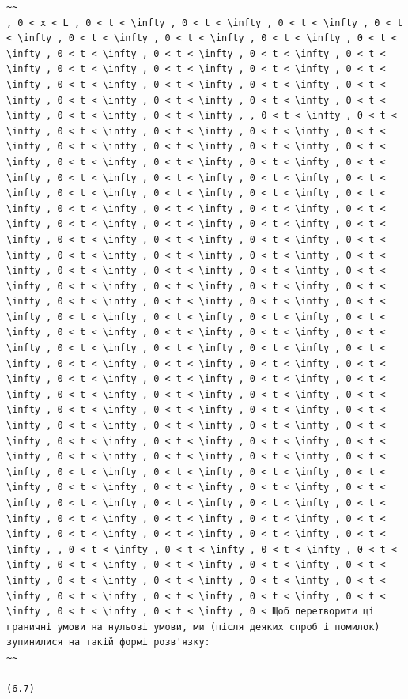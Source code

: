 \documentclass[
  ukrainian,
]{article}
\begin{document}
\begin{verbatim}
~~
, 0 < x < L , 0 < t < \infty , 0 < t < \infty , 0 < t < \infty , 0 < t < \infty , 0 < t < \infty , 0 < t < \infty , 0 < t < \infty , 0 < t < \infty , 0 < t < \infty , 0 < t < \infty , 0 < t < \infty , 0 < t < \infty , 0 < t < \infty , 0 < t < \infty , 0 < t < \infty , 0 < t < \infty , 0 < t < \infty , 0 < t < \infty , 0 < t < \infty , 0 < t < \infty , 0 < t < \infty , 0 < t < \infty , 0 < t < \infty , 0 < t < \infty , 0 < t < \infty , 0 < t < \infty , , 0 < t < \infty , 0 < t < \infty , 0 < t < \infty , 0 < t < \infty , 0 < t < \infty , 0 < t < \infty , 0 < t < \infty , 0 < t < \infty , 0 < t < \infty , 0 < t < \infty , 0 < t < \infty , 0 < t < \infty , 0 < t < \infty , 0 < t < \infty , 0 < t < \infty , 0 < t < \infty , 0 < t < \infty , 0 < t < \infty , 0 < t < \infty , 0 < t < \infty , 0 < t < \infty , 0 < t < \infty , 0 < t < \infty , 0 < t < \infty , 0 < t < \infty , 0 < t < \infty , 0 < t < \infty , 0 < t < \infty , 0 < t < \infty , 0 < t < \infty , 0 < t < \infty , 0 < t < \infty , 0 < t < \infty , 0 < t < \infty , 0 < t < \infty , 0 < t < \infty , 0 < t < \infty , 0 < t < \infty , 0 < t < \infty , 0 < t < \infty , 0 < t < \infty , 0 < t < \infty , 0 < t < \infty , 0 < t < \infty , 0 < t < \infty , 0 < t < \infty , 0 < t < \infty , 0 < t < \infty , 0 < t < \infty , 0 < t < \infty , 0 < t < \infty , 0 < t < \infty , 0 < t < \infty , 0 < t < \infty , 0 < t < \infty , 0 < t < \infty , 0 < t < \infty , 0 < t < \infty , 0 < t < \infty , 0 < t < \infty , 0 < t < \infty , 0 < t < \infty , 0 < t < \infty , 0 < t < \infty , 0 < t < \infty , 0 < t < \infty , 0 < t < \infty , 0 < t < \infty , 0 < t < \infty , 0 < t < \infty , 0 < t < \infty , 0 < t < \infty , 0 < t < \infty , 0 < t < \infty , 0 < t < \infty , 0 < t < \infty , 0 < t < \infty , 0 < t < \infty , 0 < t < \infty , 0 < t < \infty , 0 < t < \infty , 0 < t < \infty , 0 < t < \infty , 0 < t < \infty , 0 < t < \infty , 0 < t < \infty , 0 < t < \infty , 0 < t < \infty , 0 < t < \infty , 0 < t < \infty , 0 < t < \infty , 0 < t < \infty , 0 < t < \infty , 0 < t < \infty , 0 < t < \infty , 0 < t < \infty , 0 < t < \infty , 0 < t < \infty , 0 < t < \infty , 0 < t < \infty , 0 < t < \infty , 0 < t < \infty , 0 < t < \infty , 0 < t < \infty , 0 < t < \infty , 0 < t < \infty , 0 < t < \infty , 0 < t < \infty , 0 < t < \infty , 0 < t < \infty , , 0 < t < \infty , 0 < t < \infty , 0 < t < \infty , 0 < t < \infty , 0 < t < \infty , 0 < t < \infty , 0 < t < \infty , 0 < t < \infty , 0 < t < \infty , 0 < t < \infty , 0 < t < \infty , 0 < t < \infty , 0 < t < \infty , 0 < t < \infty , 0 < t < \infty , 0 < t < \infty , 0 < t < \infty , 0 < t < \infty , 0 < Щоб перетворити ці граничні умови на нульові умови, ми (після деяких спроб і помилок) зупинилися на такій формі розв'язку:
~~

(6.7)
\end{verbatim}
\end{document}
